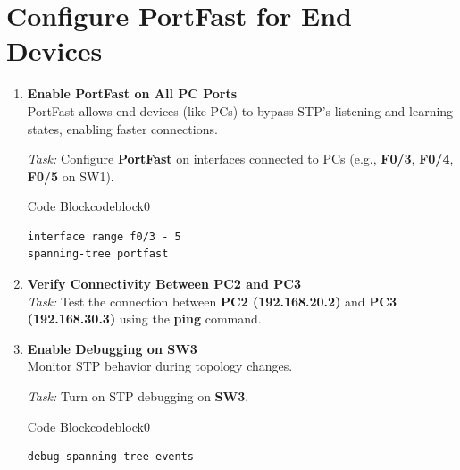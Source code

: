 \documentclass[a4paper]{book}
\begin{document}
\newpage

\section*{Configure PortFast for End Devices}

\begin{enumerate}
	\item \textbf{Enable PortFast on All PC Ports} \\
	      PortFast allows end devices (like PCs) to bypass STP's listening and learning states, enabling faster connections.

	      \textit{Task:} Configure \textbf{PortFast} on interfaces connected to PCs (e.g., \textbf{F0/3}, \textbf{F0/4}, \textbf{F0/5} on SW1).




	      \begin{ocg}{Code Block}{codeblock}{0}
		      \vspace{0.5cm}
		      \begin{lstlisting}
interface range f0/3 - 5
spanning-tree portfast
\end{lstlisting}

	      \end{ocg}

	\item \textbf{Verify Connectivity Between PC2 and PC3} \\
	      \textit{Task:} Test the connection between \textbf{PC2 (192.168.20.2)} and \textbf{PC3 (192.168.30.3)} using the \textbf{ping} command.


	\item \textbf{Enable Debugging on SW3} \\
	      Monitor STP behavior during topology changes.

	      \textit{Task:} Turn on STP debugging on \textbf{SW3}.



	      \begin{ocg}{Code Block}{codeblock}{0}
		      \vspace{0.5cm}
		      \begin{lstlisting}
debug spanning-tree events
\end{lstlisting}


\end{ocg}
\end{enumerate}
\end{document}
